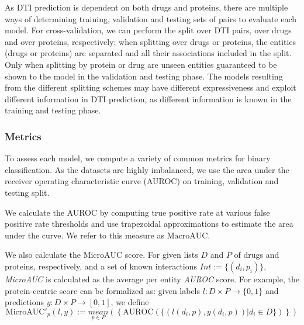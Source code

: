 \documentclass{bioinfo}
\begin{document}
As DTI prediction is dependent on both drugs and proteins, there are
multiple ways of determining training, validation and testing sets of
pairs to evaluate each model. For cross-validation, we can perform the
split over DTI pairs, over drugs and over proteins, respectively; when
splitting over drugs or proteins, the entities (drugs or proteins) are
separated and all their associations included in the split.
Only when splitting by protein or drug are unseen entities guaranteed to
be shown to the model in the validation and testing
phase. The models resulting from the different splitting schemes may
have different expressiveness and exploit different information in DTI
prediction, as different information is known in the training and
testing phase.

\subsubsection{Metrics}
\label{sec:evaluation}
To assess each model, we compute a variety of common metrics for
binary classification. As the datasets are highly imbalanced, we use
the area under the receiver operating characteristic curve
(AUROC) on training, validation and testing split.

We calculate the AUROC by computing true positive rate at various
false positive rate thresholds and use trapezoidal approximations to
estimate the area under the curve. We refer to this measure as
$\textrm{MacroAUC}$.

We also calculate the $\textrm{MicroAUC}$ score. For given lists $D$
and $P$ of drugs and proteins, respectively, and a set of known
interactions $Int := \{(d_i, p_i) \}$, \textit{MicroAUC} is calculated
as the average per entity \textit{AUROC} score. For example, the
protein-centric score can be formalized as: given labels
$l:D\times P \rightarrow \{0,1\}$ and predictions
$y:D\times P \rightarrow [0,1]$, we define
\begin{equation*}
  \textrm{MicroAUC}'_p(l,y) := \underset{p\in P}{mean}\left(\left\{
      \text{AUROC}(\{ (l(d_i, p), y(d_i,p))| d_i\in D\})
    \right\}\right)
\end{equation*}
\end{document}
